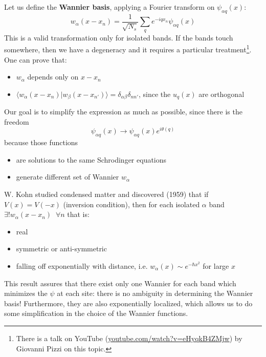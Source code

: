 Let us define the \textbf{Wannier basis}, applying a Fourier transform on $\psi_{\alpha q}(x)$:
\begin{equation*}
w_\alpha(x-x_n) = \frac{1}{\sqrt{N_s}}
\sum_q e^{-iqx_n}\psi_{\alpha q}(x)
\end{equation*}
This is a valid transformation only for isolated bands. If the bands touch somewhere, then we have a degeneracy and it requires a particular treatment\footnote{
    There is a talk on YouTube (\href{https://www.youtube.com/watch?v=eHyqkB4ZMjw}{youtube.com/watch?v=eHyqkB4ZMjw}) by Giovanni Pizzi on this topic.
}.
%
One can prove that:
\begin{itemize}
\setlength\itemsep{1mm}
    \item $w_\alpha$ depends only on $x-x_n$
    \item $\langle w_\alpha(x-x_n) | w_\beta(x-x_{n'})\rangle = \delta_{\alpha\beta}\delta_{n n'}$, since the $u_q(x)$ are orthogonal
\end{itemize}

\noindent Our goal is to simplify the expression as much as possible, since there is the freedom
$$\psi_{\alpha q}(x) \longrightarrow \psi_{\alpha q}(x)e^{i\theta(q)}$$
because those functions
\begin{itemize}
\setlength\itemsep{1mm}
    \item are solutions to the same Schrodinger equations
    \item generate different set of Wannier $w_\alpha$
\end{itemize}


\noindent W. Kohn studied condensed matter and discovered (1959) that if $V(x)=V(-x)$ (inversion condition), then for each isolated $\alpha$ band $ \exists! w_\alpha(x-x_n)\;\; \forall n$ that is:
\begin{itemize}
\setlength\itemsep{1mm}
    \item real
    \item symmetric or anti-symmetric
    \item falling off exponentially with distance, i.e. $w_\alpha(x) \sim e^{-\hbar x^2}$ for large $x$
\end{itemize}

This result assures that there exist only one Wannier for each band which minimizes the $\psi$ at each site: there is no ambiguity in determining the Wannier basis! Furthermore, they are also exponentially localized, which allows us to do some simplification in the choice of the Wannier functions.

